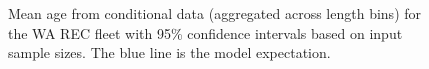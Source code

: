 \documentclass[
]{scrartcl}
\begin{document}
\begin{figure}


\caption{\label{fig-mean-age-7}Mean age from conditional data
(aggregated across length bins) for the WA REC fleet with 95\%
confidence intervals based on input sample sizes. The blue line is the
model expectation.}

\end{figure}%
\end{document}
